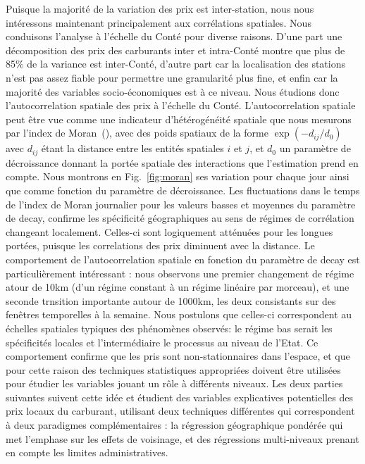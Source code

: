 {Puisque la majorité de la variation des prix est inter-station, nous nous intéressons maintenant principalement aux corrélations spatiales. Nous conduisons l'analyse à l'échelle du Conté pour diverse raisons. D'une part une décomposition des prix des carburants inter et intra-Conté montre que plus de 85\% de la variance est inter-Conté, d'autre part car la localisation des stations n'est pas assez fiable pour permettre une granularité plus fine, et enfin car la majorité des variables socio-économiques est à ce niveau. Nous étudions donc l'autocorrelation spatiale des prix à l'échelle du Conté. L'autocorrelation spatiale peut être vue comme une indicateur d'hétérogénéité spatiale que nous mesurons par l'index de Moran~(\cite{tsai2005quantifying}), avec des poids spatiaux de la forme $\exp{\left(-d_{ij} / d_0 \right)}$ avec  $d_{ij}$ étant la distance entre les entités spatiales $i$ et $j$, et $d_0$ un paramètre de décroissance donnant la portée spatiale des interactions que l'estimation prend en compte. Nous montrons en Fig.~\ref{fig:moran} ses variation pour chaque jour ainsi que comme fonction du paramètre de décroissance.
Les fluctuations dans le temps de l'index de Moran journalier pour les valeurs basses et moyennes du paramètre de decay, confirme les spécificité géographiques au sens de régimes de corrélation changeant localement. Celles-ci sont logiquement atténuées pour les longues portées, puisque les correlations des prix diminuent avec la distance. Le comportement de l'autocorrelation spatiale en fonction du paramètre de decay est particulièrement intéressant : nous observons une premier changement de régime atour de 10km (d'un régime constant à un régime linéaire par morceau), et une seconde trnsition importante autour de 1000km, les deux consistants sur des fenêtres temporelles à la semaine. Nous postulons que celles-ci correspondent au échelles spatiales typiques des phénomènes observés: le régime bas serait les spécificités locales et l'intermédiaire le processus au niveau de l'Etat. Ce comportement confirme que les pris sont non-stationnaires dans l'espace, et que pour cette raison des techniques statistiques appropriées doivent être utilisées pour étudier les variables jouant un rôle à différents niveaux. Les deux parties suivantes suivent cette idée et étudient des variables explicatives potentielles des prix locaux du carburant, utilisant deux techniques différentes qui correspondent à deux paradigmes complémentaires : la régression géographique pondérée qui met l'emphase sur les effets de voisinage, et des régressions multi-niveaux prenant en compte les limites administratives.
}


